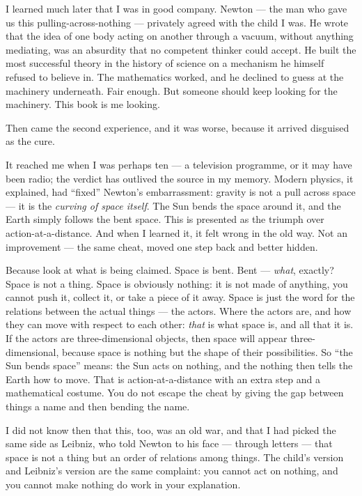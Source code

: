 \documentclass[fontsize=11pt,paper=a4,pagesize=auto,parskip=half-]{scrbook}
\begin{document}
I learned much later that I was in good company. Newton --- the man who gave us this pulling-across-nothing --- privately agreed with the child I was. He wrote that the idea of one body acting on another through a vacuum, without anything mediating, was an absurdity that no competent thinker could accept. He built the most successful theory in the history of science on a mechanism he himself refused to believe in. The mathematics worked, and he declined to guess at the machinery underneath. Fair enough. But someone should keep looking for the machinery. This book is me looking.

Then came the second experience, and it was worse, because it arrived disguised as the cure.

It reached me when I was perhaps ten --- a television programme, or it may have been radio; the verdict has outlived the source in my memory. Modern physics, it explained, had ``fixed'' Newton's embarrassment: gravity is not a pull across space --- it is the \emph{curving of space itself}. The Sun bends the space around it, and the Earth simply follows the bent space. This is presented as the triumph over action-at-a-distance. And when I learned it, it felt wrong in the old way. Not an improvement --- the same cheat, moved one step back and better hidden.

Because look at what is being claimed. Space is bent. Bent --- \emph{what}, exactly? Space is not a thing. Space is obviously nothing: it is not made of anything, you cannot push it, collect it, or take a piece of it away. Space is just the word for the relations between the actual things --- the actors. Where the actors are, and how they can move with respect to each other: \emph{that} is what space is, and all that it is. If the actors are three-dimensional objects, then space will appear three-dimensional, because space is nothing but the shape of their possibilities. So ``the Sun bends space'' means: the Sun acts on nothing, and the nothing then tells the Earth how to move. That is action-at-a-distance with an extra step and a mathematical costume. You do not escape the cheat by giving the gap between things a name and then bending the name.

I did not know then that this, too, was an old war, and that I had picked the same side as Leibniz, who told Newton to his face --- through letters --- that space is not a thing but an order of relations among things. The child's version and Leibniz's version are the same complaint: you cannot act on nothing, and you cannot make nothing do work in your explanation.
\end{document}
